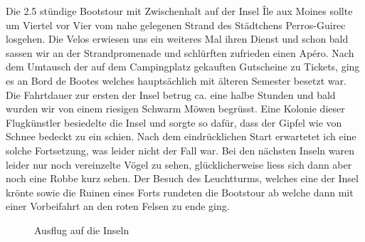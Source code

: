 Die 2.5 stündige Bootstour mit Zwischenhalt auf der Insel Île aux Moines sollte um Viertel vor Vier vom nahe gelegenen Strand des Städtchens Perros-Guirec losgehen.
Die Velos erwiesen uns ein weiteres Mal ihren Dienst und schon bald sassen wir an der Strandpromenade und schlürften zufrieden einen Apéro.
Nach dem Umtausch der auf dem Campingplatz gekauften Gutscheine zu Tickets, ging es an Bord de Bootes welches hauptsächlich mit älteren Semester besetzt war.
Die Fahrtdauer zur ersten der Insel betrug ca. eine halbe Stunden und bald wurden wir von einem riesigen Schwarm Möwen begrüsst.
Eine Kolonie dieser Flugkünstler besiedelte die Insel und sorgte so dafür, dass der Gipfel wie von Schnee bedeckt zu ein schien.
Nach dem eindrücklichen Start erwartetet ich eine solche Fortsetzung, was leider nicht der Fall war.
Bei den nächsten Inseln waren leider nur noch vereinzelte Vögel zu sehen, glücklicherweise liess sich dann aber noch eine Robbe kurz sehen.
Der Besuch des Leuchtturms, welches eine der Insel krönte sowie die Ruinen eines Forts rundeten die Bootstour ab welche dann mit einer Vorbeifahrt an den roten Felsen zu ende ging.

\begin{figure}[H]
   \centering
   \quad
   \quad
   \quad
   \caption[Ausflug auf die Inseln]{Ausflug auf die Inseln}
\end{figure}

